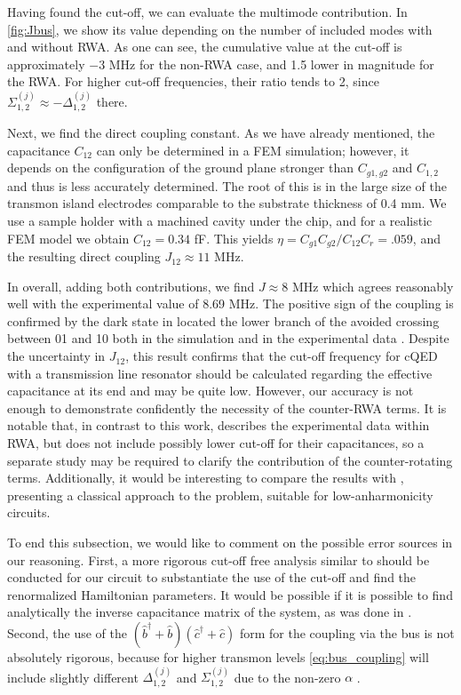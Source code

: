 \documentclass[%
 aps, prx,
 amsmath,amssymb,
 reprint,%
superscriptaddress
]{revtex4-2}
\begin{document}
Having found the cut-off, we can evaluate the multimode contribution. In \autoref{fig:Jbus}, we show its value depending on the number of included modes with and without RWA. As one can see, the cumulative value at the cut-off is approximately $-3$ MHz for the non-RWA case, and 1.5 lower in magnitude for the RWA. For higher cut-off frequencies, their ratio tends to 2, since $\Sigma_{1,2}^{(j)} \approx -\Delta_{1,2}^{(j)}$ there.

Next, we find the direct coupling constant. As we have already mentioned, the capacitance $C_{12}$ can only be determined in a FEM simulation; however, it depends on the configuration of the ground plane stronger than $C_{g1, g2}$ and $C_{1,2}$ and thus is less accurately determined. The root of this is in the large size of the transmon island electrodes comparable to the substrate thickness of 0.4 mm. We use a sample holder with a machined cavity under the chip, and for a realistic FEM model we obtain $C_{12} = 0.34$ fF. This yields $\eta = C_{g1}C_{g2}/C_{12}C_r = .059$, and the resulting direct coupling $J_{12} \approx 11$ MHz. 

In overall, adding both contributions, we find $J \approx 8$ MHz which agrees reasonably well with the experimental value of 8.69 MHz. The positive sign of the coupling is confirmed by the dark state in located the lower branch of the avoided crossing between 01 and 10 both in the simulation and in the experimental data \cite{filipp2011multimode}. Despite the uncertainty in $J_{12}$, this result confirms that the cut-off frequency for cQED with a transmission line resonator should be calculated regarding the effective capacitance at its end and may be quite low. However, our accuracy is not enough to demonstrate confidently the necessity of the counter-RWA terms. It is notable that, in contrast to this work, \cite{filipp2011multimode} describes the experimental data within RWA, but does not include possibly lower cut-off for their capacitances, so a separate study may be required to clarify the contribution of the counter-rotating terms. Additionally, it would be interesting to compare the results with \cite{solgun2019simple}, presenting a classical approach to the problem, suitable for low-anharmonicity circuits.

To end this subsection, we would like to comment on the possible error sources in our reasoning. First, a more rigorous cut-off free analysis similar to \cite{gely2017convergence} should be conducted for our circuit to substantiate the use of the cut-off and find the renormalized Hamiltonian parameters. It would be possible if it is possible to find analytically the inverse capacitance matrix of the system, as was done in \cite{gely2017convergence}. Second, the use of the $(\hat b^\dag + \hat b) (\hat c^\dag + \hat c)$ form for the coupling via the bus is not absolutely rigorous, because for higher transmon levels \autoref{eq:bus_coupling} will include slightly different $\Delta_{1,2}^{(j)}$ and $\Sigma_{1,2}^{(j)}$ due to the non-zero $\alpha$ \cite{chow2010phd}.
\end{document}
